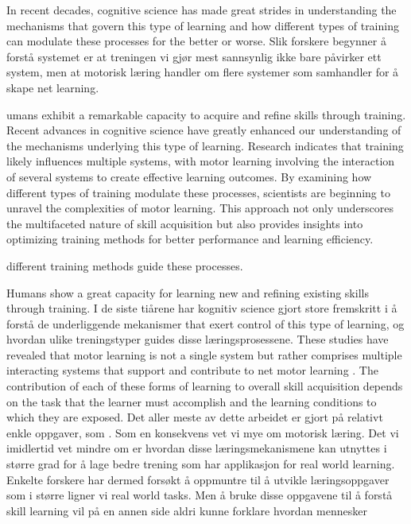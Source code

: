 In recent decades, cognitive science has made great strides in understanding the mechanisms that govern this type of learning and how different types of training can modulate these processes for the better or worse. Slik forskere begynner å forstå systemet er at treningen vi gjør mest sannsynlig ikke bare påvirker ett system, men at motorisk læring handler om flere systemer som samhandler for å skape net learning. 

umans exhibit a remarkable capacity to acquire and refine skills through training. Recent advances in cognitive science have greatly enhanced our understanding of the mechanisms underlying this type of learning. Research indicates that training likely influences multiple systems, with motor learning involving the interaction of several systems to create effective learning outcomes. By examining how different types of training modulate these processes, scientists are beginning to unravel the complexities of motor learning. This approach not only underscores the multifaceted nature of skill acquisition but also provides insights into optimizing training methods for better performance and learning efficiency. 

different training methods guide these processes.  

 


Humans show a great capacity for learning new and refining existing skills through training. I de siste tiårene har kognitiv science gjort store fremskritt i å forstå de underliggende mekanismer that exert control of this type of learning, og hvordan ulike treningstyper guides disse læringsprosessene. These studies have revealed that motor learning is not a single system but rather comprises multiple interacting systems that support and contribute to net motor learning \cite{haith_model-based_2013, uehara_learning_2018, doya_complementary_2000, spampinato_multiple_2021,makino_circuit_2016, huang_rethinking_2011, wolpert_principles_2011, wolpert_motor_2010}. The contribution of each of these forms of learning to overall skill acquisition depends on the task that the learner must accomplish and the learning conditions to which they are exposed. Det aller meste av dette arbeidet er gjort på relativt enkle oppgaver, som . Som en konsekvens vet vi mye om motorisk læring. Det vi imidlertid vet mindre om er hvordan disse læringsmekanismene kan utnyttes i større grad for å lage bedre trening som har applikasjon for real world learning. Enkelte forskere har dermed forsøkt å oppmuntre til å utvikle læringsoppgaver som i større ligner vi real world tasks. Men å bruke disse oppgavene til å forstå skill learning vil på en annen side aldri kunne forklare hvordan mennesker  


